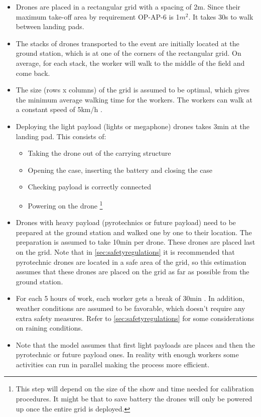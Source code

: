\begin{itemize} [noitemsep, nolistsep]
    \item Drones are placed in a rectangular grid with a spacing of 2m. Since their maximum take-off area by requirement OP-AP-6 is 1$m^2$. It takes 30s to walk between landing pads.
    
    \item The stacks of drones transported to the event are initially located at the ground station, which is at one of the corners of the rectangular grid. On average, for each stack, the worker will walk to the middle of the field and come back.
    
    \item The size (rows x columns) of the grid is assumed to be optimal, which gives the minimum average walking time for the workers. The workers can walk at a constant speed of 5km/h \cite{walkspeed}.


    \item Deploying the light payload (lights or megaphone) drones takes 3min at the landing pad. This consists of:
    \begin{itemize}[noitemsep,nolistsep]
        \item Taking the drone out of the carrying structure
        \item Opening the case, inserting the battery and closing the case
        \item Checking payload is correctly connected
        \item Powering on the drone \footnote{This step will depend on the size of the show and time needed for calibration procedures. It might be that to save battery the drones will only be powered up once the entire grid is deployed.}
    \end{itemize}
    \item Drones with heavy payload (pyrotechnics or future payload) need to be prepared at the ground station and walked one by one to their location. The preparation is assumed to take 10min per drone. These drones are placed last on the grid. Note that in \autoref{sec:safetyregulations} it is recommended that pyrotechnic drones are located in a safe area of the grid, so this estimation assumes that these drones are placed on the grid as far as possible from the ground station.

    \item For each 5 hours of work, each worker gets a break of 30min \cite{waterbreaks}. In addition, weather conditions are assumed to be favorable, which doesn't require any extra safety measures. Refer to \autoref{sec:safetyregulations} for some considerations on raining conditions.
    
    \item Note that the model assumes that first light payloads are places and then the pyrotechnic or future payload ones. In reality with enough workers some activities can run in parallel making the process more efficient. 
\end{itemize}

